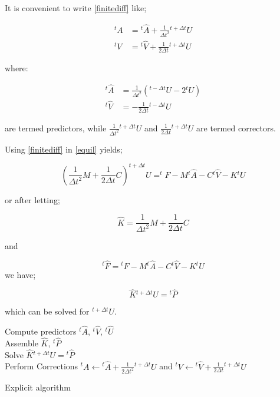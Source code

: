 It is convenient to write \cref{finitediff} like;

\begin{equation}
\begin{aligned}
{}^tA & = {}^t\hat A + \frac{1}{{\Delta {t^2}}}{}^{t + \Delta t}U\\
{}^tV & = {}^t\hat V + \frac{1}{{2\Delta t}}{}^{t + \Delta t}U
\end{aligned}
\label{precorr}
\end{equation}

where:

\begin{equation}
\begin{aligned}
{}^t\hat A & = \frac{1}{{\Delta {t^2}}}\left( {{}^{t - \Delta t}U - 2{}^tU} \right)\\
{}^t\hat V & =  - \frac{1}{{2\Delta t}}{}^{t - \Delta t}U
\end{aligned}
\label{pred}
\end{equation}

are termed predictors, while $\frac{1}{{\Delta {t^2}}}{}^{t + \Delta t}U$ and $\frac{1}{{2\Delta t}}{}^{t + \Delta t}U$ are termed correctors.

Using \cref{finitediff} in \cref{equil} yields;


\begin{equation}
\left(\dfrac{1}{\Delta t^2}M+\dfrac{1}{2\Delta t}C\right) ^{t+\Delta t}U=^{t}F-M{}^t\hat A - C{}^t\hat V - K{}^tU
\label{resequil}
\end{equation}

or after letting;

\[\hat K = \frac{1}{{\Delta {t^2}}}M + \frac{1}{{2\Delta t}}C\]

and

\[{}^t\hat F = {}^tF - M{}^t\hat A - C{}^t\hat V - K{}^tU\] we have;

\[\hat K{}^{t + \Delta t}U = {}^t\hat P\]

which can be solved for ${}^{t + \Delta t}U$.

\begin{algorithm}[H]
\SetAlgoLined
{}
Compute predictors ${}^t\hat A$, ${}^t\hat V$, ${}^t\hat U$\\
Assemble  $\hat K$, ${}^t\hat P$\\
Solve $\hat K{}^{t + \Delta t}U = {}^t\hat P$\\
Perform Corrections ${}^tA \leftarrow {}^t\hat A + \frac{1}{{2\Delta {t^2}}}{}^{t + \Delta t}U$ and ${}^tV \leftarrow {}^t\hat V + \frac{1}{{2\Delta t}}{}^{t + \Delta t}U$
\caption{Explicit algorithm}
\end{algorithm}



